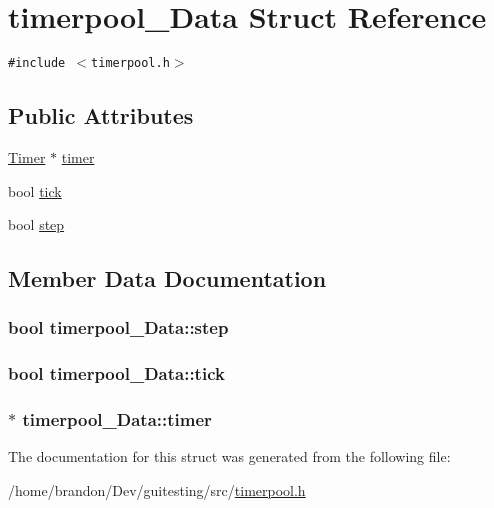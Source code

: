 \hypertarget{structtimerpool___data}{
\section{timerpool\_\-Data Struct Reference}
\label{structtimerpool___data}
}
{\tt \#include $<$timerpool.h$>$}

\subsection*{Public Attributes}
\begin{CompactItemize}
\item 
\hyperlink{class_timer}{Timer} $\ast$ \hyperlink{structtimerpool___data_7810a6e348b61f65a049f24358b8a324}{timer}
\item 
bool \hyperlink{structtimerpool___data_b334ff7f1d4b6ae513c3f796b84055d3}{tick}
\item 
bool \hyperlink{structtimerpool___data_0f298475c6aaa4a875e442f629a8c00b}{step}
\end{CompactItemize}


\subsection{Member Data Documentation}
\hypertarget{structtimerpool___data_0f298475c6aaa4a875e442f629a8c00b}{
\subsubsection[{step}]{\setlength{\rightskip}{0pt plus 5cm}bool {\bf timerpool\_\-Data::step}}}
\label{structtimerpool___data_0f298475c6aaa4a875e442f629a8c00b}


\hypertarget{structtimerpool___data_b334ff7f1d4b6ae513c3f796b84055d3}{
\subsubsection[{tick}]{\setlength{\rightskip}{0pt plus 5cm}bool {\bf timerpool\_\-Data::tick}}}
\label{structtimerpool___data_b334ff7f1d4b6ae513c3f796b84055d3}


\hypertarget{structtimerpool___data_7810a6e348b61f65a049f24358b8a324}{
\subsubsection[{timer}]{$\ast$ {\bf timerpool\_\-Data::timer}}}
\label{structtimerpool___data_7810a6e348b61f65a049f24358b8a324}




The documentation for this struct was generated from the following file:\begin{CompactItemize}
\item 
/home/brandon/Dev/guitesting/src/\hyperlink{timerpool_8h}{timerpool.h}\end{CompactItemize}
